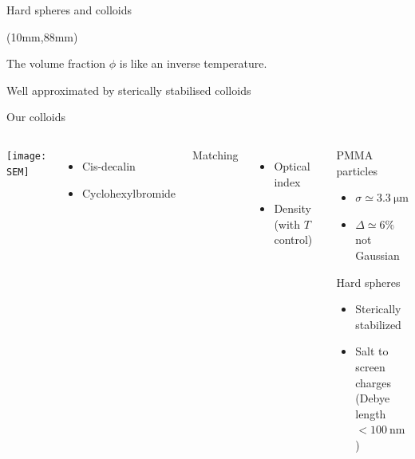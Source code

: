 \begin{frame}{Hard spheres and colloids}
	\begin{textblock*}{0.6\textwidth}(10mm,88mm)
		\simplephasediagram{}%
	\end{textblock*}
	The volume fraction $\phi$ is like an inverse temperature.
	\bigskip
	\def\svgwidth{\textwidth}
	
	\bigskip
	Well approximated by sterically stabilised colloids\\
	\begin{footnotesize}\citet{pusey1987ogt}\end{footnotesize}
\end{frame}

\begin{frame}{Our colloids}
	\begin{columns}
	\begin{center}
	\texttt{[image: SEM]}
	\end{center}
	\begin{itemize}
		\item Cis-decalin
		\item Cyclohexylbromide
	\end{itemize}
	Matching
	\begin{itemize}
		\item Optical index
		\item Density (with $T$ control)
	\end{itemize}
	\begin{block}{PMMA particles}
		\begin{itemize}
			\item $\sigma \simeq \SI{3.3}{\micro\metre}$
			\item $\Delta \simeq 6\%$ not Gaussian
		\end{itemize}
		Hard spheres
		\begin{itemize}
			\item Sterically stabilized
			\item Salt to screen charges\\ (Debye length $<\SI{100}{\nano\metre}$)
		\end{itemize}
	\end{block}
	\end{columns}
\end{frame}

